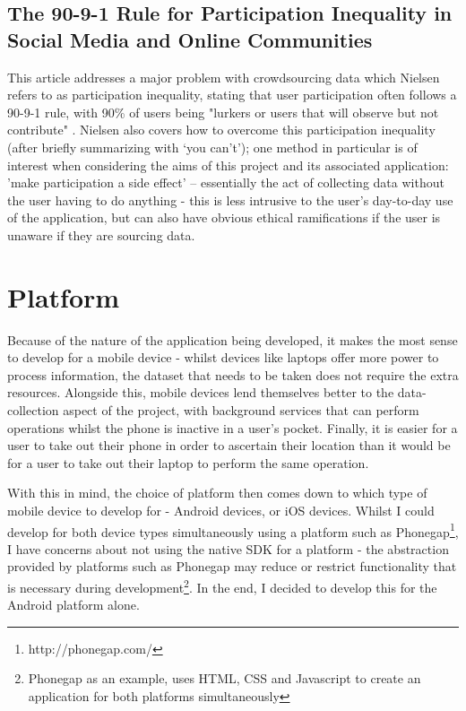 \documentclass[11pt]{informatics-report}
\begin{document}
\subsection{The 90-9-1 Rule for Participation Inequality in Social Media and Online Communities}\cite{participationinequality}

This article addresses a major problem with crowdsourcing data which Nielsen refers to as participation inequality, stating that user participation often follows a 90-9-1 rule, with 90\% of users being "lurkers or users that will observe but not contribute"\cite{participationinequality} . Nielsen also covers how to overcome this participation inequality (after briefly summarizing with ‘you can’t’); one method in particular is of interest when considering the aims of this project and its associated application: 'make participation a side effect'  – essentially the act of collecting data without the user having to do anything - this is less intrusive to the user’s day-to-day use of the application, but can also have obvious ethical ramifications if the user is unaware if they are sourcing data.

\section{Platform}

Because of the nature of the application being developed, it makes the most sense to develop for a mobile device - whilst devices like laptops offer more power to process information, the dataset that needs to be taken does not require the extra resources. Alongside this, mobile devices lend themselves better to the data-collection aspect of the project, with background services that can perform operations whilst the phone is inactive in a user's pocket. Finally, it is easier for a user to take out their phone in order to ascertain their location than it would be for a user to take out their laptop to perform the same operation.

With this in mind, the choice of platform then comes down to which type of mobile device to develop for - Android devices, or iOS devices. Whilst I could develop for both device types simultaneously using a platform such as Phonegap\footnote{http://phonegap.com/}, I have concerns about not using the native SDK for a platform - the abstraction provided by platforms such as Phonegap may reduce or restrict functionality that is necessary during development\footnote{Phonegap as an example, uses HTML, CSS and Javascript to create an application for both platforms simultaneously}. In the end, I decided to develop this for the Android platform alone.
\end{document}
